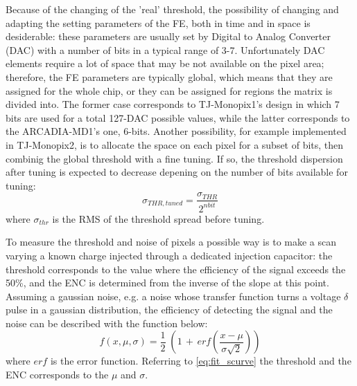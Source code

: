         Because of the changing of the 'real' threshold, the possibility of changing and adapting the setting parameters of the FE, both in time and in space is desiderable: these parameters are usually set by Digital to Analog Converter (DAC) with a number of bits in a typical range of 3-7.
        Unfortunately DAC elements require a lot of space that may be not available on the pixel area; therefore, the FE parameters are typically global, which means that they are assigned for the whole chip, or they can be assigned for regions the matrix is divided into. 
        The former case corresponds to TJ-Monopix1's design in which 7 bits are used for a total 127-DAC possible values, while the latter corresponds to the ARCADIA-MD1's one, 6-bits. 
        Another possibility, for example implemented in TJ-Monopix2, is to allocate the space on each pixel for a subset of bits, then combinig the global threshold with a fine tuning. 
        If so, the threshold dispersion after tuning is expected to decrease depening on the number of bits available for tuning:
        \begin{equation}
            \sigma_{THR, tuned} = \frac{\sigma_{THR}}{2^{n bit}}
        \end{equation}    
        where $\sigma_{thr}$ is the RMS of the threshold spread before tuning.

        To measure the threshold and noise of pixels a possible way is to make a scan varying a known charge injected through a dedicated injection capacitor: the threshold corresponds to the value where the efficiency of the signal exceeds the 50\%, and the ENC is determined from the inverse of the slope at this point.        
        Assuming a gaussian noise, e.g. a noise whose transfer function turns a voltage $\delta$ pulse in a gaussian distribution, the efficiency of detecting the signal and the noise can be described with  the function below:
        \begin{equation}
            f(x, \mu, \sigma) = \frac{1}{2} \; \left(1\,+\,erf\left(\frac{x-\mu}{\sigma \sqrt{2}}\right)\right)
            \label{eq:fit_scurve}
        \end{equation}
        where $erf$ is the error function. 
        Referring to \ref{eq:fit_scurve} the threshold and the ENC corresponds to the $\mu$ and $\sigma$.
    
